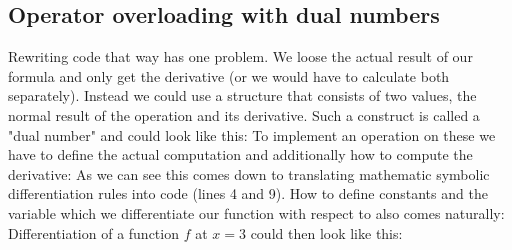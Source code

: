 \subsection{Operator overloading with dual numbers}
Rewriting code that way has one problem. We loose the actual result of our formula and only get the derivative (or we would have to calculate both separately). Instead we could use a structure that consists of two values, the normal result of the operation and its derivative. Such a construct is called a "dual number"  and could look like this:
To implement an operation on these we have to define the actual computation and additionally how to compute the derivative:
As we can see this comes down to translating mathematic symbolic differentiation rules into code (lines 4 and 9). How to define constants and the variable which we differentiate our function with respect to \todogrammar also comes naturally:
Differentiation of a function $f$ at $x = 3$ could then look like this:



